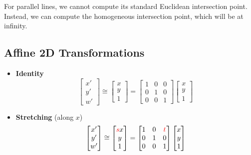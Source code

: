 \begin{remark}
    For parallel lines, we cannot compute its standard Euclidean intersection point. Instead, we can compute the homogeneous intersection point, which will be at infinity.
\end{remark}

\subsection{Affine 2D Transformations}

\begin{itemize}
    \item \textbf{Identity} \[
        \begin{bmatrix}
            x' \\ y' \\ w'
        \end{bmatrix} \cong \begin{bmatrix}
            x \\ y \\ 1
        \end{bmatrix} = \begin{bmatrix}
            1 & 0 & 0 \\
            0 & 1 & 0 \\
            0 & 0 & 1
        \end{bmatrix} \begin{bmatrix}
            x \\ y \\ 1
        \end{bmatrix}
    \]

    \item \textbf{Stretching} (along $x$) \[
        \begin{bmatrix}
            x' \\ y' \\ w'
        \end{bmatrix} \cong \begin{bmatrix}
            {\color{red} s} x \\ y \\ 1
        \end{bmatrix} = \begin{bmatrix}
            1 & 0 & {\color{red} t} \\
            0 & 1 & 0 \\
            0 & 0 & 1
        \end{bmatrix} \begin{bmatrix}
            x \\ y \\ 1
        \end{bmatrix}
    \]
    

\end{itemize}
